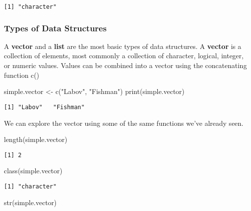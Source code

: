 \documentclass[
  10pt,
  letterpaper]{article}
\newenvironment{Shaded}{\begin{snugshade}}{\end{snugshade}}
\newcommand{\FunctionTok}[1]{\textcolor[rgb]{0.28,0.35,0.67}{#1}}
\newcommand{\NormalTok}[1]{\textcolor[rgb]{0.00,0.23,0.31}{#1}}
\newcommand{\OtherTok}[1]{\textcolor[rgb]{0.00,0.23,0.31}{#1}}
\newcommand{\StringTok}[1]{\textcolor[rgb]{0.13,0.47,0.30}{#1}}
\renewcommand\texttt[1]{{\ttfamily\color{BrickRed}#1}}
\begin{document}
\begin{verbatim}
[1] "character"
\end{verbatim}

\hypertarget{types-of-data-structures}{%
\subsubsection{Types of Data
Structures}\label{types-of-data-structures}}

A \textbf{vector} and a \textbf{list} are the most basic types of data
structures. A \textbf{vector} is a collection of elements, most commonly
a collection of \texttt{character}, \texttt{logical}, \texttt{integer},
or \texttt{numeric} values. Values can be combined into a vector using
the concatenating function \texttt{c()}

\begin{Shaded}
\begin{Highlighting}[]
\NormalTok{simple.vector }\OtherTok{\textless{}{-}} \FunctionTok{c}\NormalTok{(}\StringTok{"Labov"}\NormalTok{, }\StringTok{"Fishman"}\NormalTok{)}
\FunctionTok{print}\NormalTok{(simple.vector)}
\end{Highlighting}
\end{Shaded}

\begin{verbatim}
[1] "Labov"   "Fishman"
\end{verbatim}

We can explore the vector using some of the same functions we've already
seen.

\begin{Shaded}
\begin{Highlighting}[]
\FunctionTok{length}\NormalTok{(simple.vector)}
\end{Highlighting}
\end{Shaded}

\begin{verbatim}
[1] 2
\end{verbatim}

\begin{Shaded}
\begin{Highlighting}[]
\FunctionTok{class}\NormalTok{(simple.vector)}
\end{Highlighting}
\end{Shaded}

\begin{verbatim}
[1] "character"
\end{verbatim}

\begin{Shaded}
\begin{Highlighting}[]
\FunctionTok{str}\NormalTok{(simple.vector)}
\end{Highlighting}
\end{Shaded}
\end{document}
